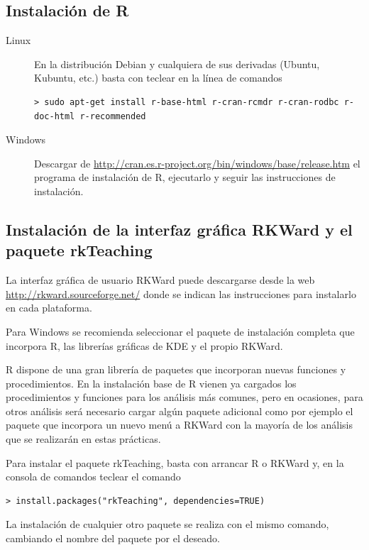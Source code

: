 \subsection{Instalación de R}
\begin{description}
\item[Linux] En la distribución Debian y cualquiera de sus derivadas (Ubuntu, Kubuntu, etc.) basta con teclear en la línea de
comandos
\begin{lstlisting}
> sudo apt-get install r-base-html r-cran-rcmdr r-cran-rodbc r-doc-html r-recommended
\end{lstlisting}
\item[Windows] Descargar de \url{http://cran.es.r-project.org/bin/windows/base/release.htm} el programa de instalación
de R, ejecutarlo y seguir las instrucciones de instalación.
\end{description}

\subsection{Instalación de la interfaz gráfica RKWard y el paquete rkTeaching}
La interfaz gráfica de usuario RKWard puede descargarse desde la web \url{http://rkward.sourceforge.net/} donde se
indican las instrucciones para instalarlo en cada plataforma.

Para Windows se recomienda seleccionar el paquete de instalación completa que incorpora R, las librerías gráficas de KDE
y el propio RKWard.

R dispone de una gran librería de paquetes que incorporan nuevas funciones y procedimientos.
En la instalación base de R vienen ya cargados los procedimientos y funciones para los análisis más comunes, pero en
ocasiones, para otros análisis será necesario cargar algún paquete adicional como por ejemplo el paquete
 que incorpora un nuevo menú a RKWard con la mayoría de los análisis que se realizarán en estas
prácticas.

Para instalar el paquete rkTeaching, basta con arrancar R o RKWard y, en la consola de comandos teclear el
comando
\begin{lstlisting}
> install.packages("rkTeaching", dependencies=TRUE)
\end{lstlisting}

La instalación de cualquier otro paquete se realiza con el mismo comando, cambiando el nombre del paquete por el
deseado.

